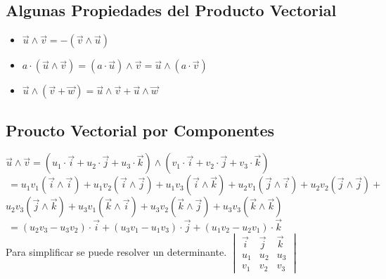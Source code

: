 \documentclass[11pt,a4paper]{article}
\begin{document}
\subsection{Algunas Propiedades del Producto Vectorial}
\begin{itemize}
\item $\overrightarrow{u} \wedge \overrightarrow{v} = -(\overrightarrow{v}\wedge\overrightarrow{u})$
\item $a\cdot(\overrightarrow{u} \wedge \overrightarrow{v}) = (a\cdot\overrightarrow{u})\wedge\overrightarrow{v} = \overrightarrow{u}\wedge(a\cdot\overrightarrow{v})$
\item $\overrightarrow{u}\wedge(\overrightarrow{v}+\overrightarrow{w}) = \overrightarrow{u}\wedge\overrightarrow{v} + \overrightarrow{u} \wedge \overrightarrow{w}$
\end{itemize}

\subsection{Proucto Vectorial por Componentes}
\noindent $\overrightarrow{u} \wedge \overrightarrow{v} = (u_1\cdot\overrightarrow{i} + u_2\cdot\overrightarrow{j} + u_3\cdot\overrightarrow{k}) \wedge (v_1\cdot\overrightarrow{i} + v_2\cdot\overrightarrow{j} + v_3\cdot\overrightarrow{k})$\\
\indent \indent $\ = 
u_1v_1 (\overrightarrow{i}\wedge\overrightarrow{i}) + 
u_1v_2 (\overrightarrow{i}\wedge\overrightarrow{j}) + 
u_1v_3 (\overrightarrow{i}\wedge\overrightarrow{k}) + 
u_2v_1 (\overrightarrow{j}\wedge\overrightarrow{i}) + 
u_2v_2 (\overrightarrow{j}\wedge\overrightarrow{j}) + $\\
\indent \indent \indent $
u_2v_3 (\overrightarrow{j}\wedge\overrightarrow{k}) + 
u_3v_1 (\overrightarrow{k}\wedge\overrightarrow{i}) + 
u_3v_2 (\overrightarrow{k}\wedge\overrightarrow{j}) + 
u_3v_3 (\overrightarrow{k}\wedge\overrightarrow{k})$ \\
\indent \indent $\ = (u_2v_3-u_3v_2)\cdot\overrightarrow{i} + (u_3v_1-u_1v_3)\cdot \overrightarrow{j} + (u_1v_2-u_2v_1) \cdot \overrightarrow{k}$\\

\noindent Para simplificar se puede resolver un determinante.
$\begin{vmatrix}
\overrightarrow{i} & \overrightarrow{j} & \overrightarrow{k} \\ 
u_1 & u_2 & u_3 \\ 
v_1 & v_2 & v_3
\end{vmatrix}$
\end{document}
